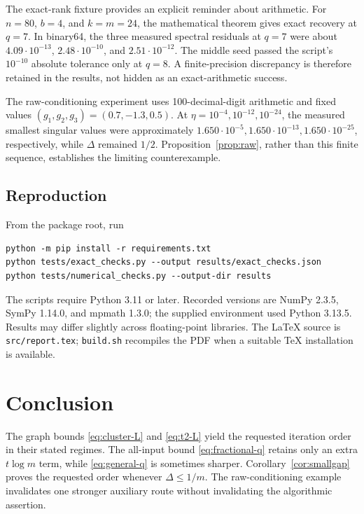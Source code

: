 \documentclass[11pt]{article}
\theoremstyle{definition}
\begin{document}
The exact-rank fixture provides an explicit reminder about arithmetic.
For $n=80$, $b=4$, and $k=m=24$, the mathematical theorem gives exact recovery
at $q=7$. In binary64, the three measured spectral residuals at $q=7$ were
about $4.09\cdot10^{-13}$, $2.48\cdot10^{-10}$, and $2.51\cdot10^{-12}$.
The middle seed passed the script's $10^{-10}$ absolute tolerance only at
$q=8$. A finite-precision discrepancy is therefore retained in the results,
not hidden as an exact-arithmetic success.

The raw-conditioning experiment uses 100-decimal-digit arithmetic and
fixed values $(g_1,g_2,g_3)=(0.7,-1.3,0.5)$. At $\eta=10^{-4},10^{-12},10^{-24}$,
the measured smallest singular values were approximately
$1.650\cdot10^{-5},1.650\cdot10^{-13},1.650\cdot10^{-25}$, respectively,
while $\Delta$ remained $1/2$. Proposition~\ref{prop:raw}, rather than this
finite sequence, establishes the limiting counterexample.

\subsection{Reproduction}

From the package root, run
\begin{verbatim}
python -m pip install -r requirements.txt
python tests/exact_checks.py --output results/exact_checks.json
python tests/numerical_checks.py --output-dir results
\end{verbatim}
The scripts require Python 3.11 or later. Recorded versions are NumPy 2.3.5,
SymPy 1.14.0, and mpmath 1.3.0; the supplied environment used Python 3.13.5.
Results may differ slightly across floating-point libraries.
The LaTeX source is \texttt{src/report.tex}; \texttt{build.sh} recompiles the
PDF when a suitable TeX installation is available.

\section{Conclusion}

The graph bounds \eqref{eq:cluster-L} and \eqref{eq:t2-L} yield the requested
iteration order in their stated regimes. The all-input bound \eqref{eq:fractional-q} retains only an extra
$t\log m$ term, while \eqref{eq:general-q} is sometimes sharper.
Corollary~\ref{cor:smallgap} proves the requested order whenever
$\Delta\leq1/m$. The raw-conditioning example invalidates one stronger
auxiliary route without invalidating the algorithmic assertion.
\end{document}
